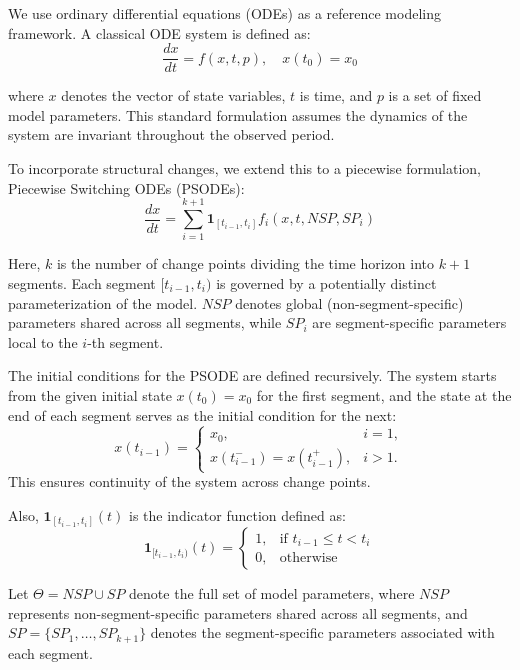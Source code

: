 \documentclass[10pt,letterpaper]{article}
\begin{document}
We use ordinary differential equations (ODEs) as a reference modeling framework. A classical ODE system is defined as:
\begin{equation}
   \frac{dx}{dt} = f(x, t, p), \quad x(t_0) = x_0
\end{equation}

where \( x \) denotes the vector of state variables, \(t \) is time, and \( p \) is a set of fixed model parameters. This standard formulation assumes the dynamics of the system are invariant throughout the observed period.

To incorporate structural changes, we extend this to a piecewise formulation, Piecewise Switching ODEs (PSODEs):
\begin{equation}
\frac{dx}{dt} = \sum_{i=1}^{k+1} \mathbf{1}_{[t_{i-1}, t_i]} f_i(x, t, NSP, SP_i)
\end{equation}

Here, \( k \) is the number of change points dividing the time horizon into \( k+1 \) segments. Each segment \( [t_{i-1}, t_i) \) is governed by a potentially distinct parameterization of the model. \( NSP \) denotes global (non-segment-specific) parameters shared across all segments, while \( SP_i \) are segment-specific parameters local to the \( i \)-th segment. 

The initial conditions for the PSODE are defined recursively. The system starts from the given initial state \( x(t_0) = x_0 \) for the first segment, and the state at the end of each segment serves as the initial condition for the next:
\begin{equation}
x(t_{i-1}) =
\begin{cases}
x_0, & i = 1, \\
x(t_{i-1}^-) = x(t_{i-1}^+), & i > 1.
\end{cases}
\end{equation}
This ensures continuity of the system across change points.

Also, \( \mathbf{1}_{[t_{i-1}, t_i]}(t) \) is the indicator function defined as:
\begin{equation}
\mathbf{1}_{[t_{i-1}, t_i)}(t) = 
\begin{cases}
1, & \text{if } t_{i-1} \leq t < t_i \\
0, & \text{otherwise}
\end{cases}
\end{equation}

Let \(\Theta = NSP \cup SP\) denote the full set of model parameters,
where \(NSP\) represents non-segment-specific parameters shared across
all segments, and \(SP = \{SP_1, \dots, SP_{k+1}\}\) denotes the
segment-specific parameters associated with each segment.
\end{document}
